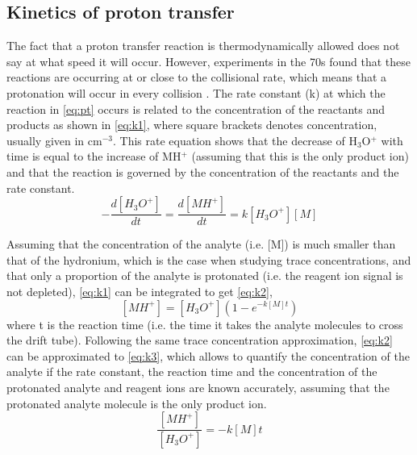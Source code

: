 \subsection{Kinetics of proton transfer}
The fact that a proton transfer reaction is thermodynamically allowed  does not say at what speed it will occur. %
%
However, \citeauthor{schiff1975flowing} experiments in the 70s found that these reactions are occurring at or close to the collisional rate, which means that a protonation will occur  in every collision \cite{schiff1975flowing}.
%
The rate constant (\acrshort{k}) at which  the reaction in \autoref{eq:pt} occurs is
related to the concentration of the reactants and products as %
shown in \autoref{eq:k1},
where square brackets denotes concentration, usually given in cm$^{-3}$.
%
This rate equation shows that the decrease of H$_3$O$^+$ with time is equal to the increase of MH$^+$ (assuming that this is the only product ion) and that the reaction is governed by the concentration  of the reactants and the rate constant.
\begin{equation}
\label{eq:k1}
-\frac{d[H_3 O^+ ]}{dt} = \frac{d[MH^+]}{dt} = k[H_3 O^+ ][M]
\end{equation}

Assuming that the concentration of the analyte (i.e. [M]) is much smaller than that of the hydronium, which is the case when studying trace concentrations, and that only a  proportion of the analyte is protonated (i.e. the reagent ion signal is not depleted), \autoref{eq:k1} can be integrated to get \autoref{eq:k2},
\begin{equation}
\label{eq:k2}
[MH^+] = [H_3O^+]\left(1-e^{-k[M]t}\right)
\end{equation}
where t is the reaction time (i.e. the time it takes the analyte molecules to cross the drift tube).
%
Following the same trace concentration approximation, \autoref{eq:k2} can be approximated to \autoref{eq:k3}, which allows to quantify the concentration of the analyte if the rate constant, the reaction time and the concentration of the protonated analyte and reagent ions are known accurately, assuming that the protonated analyte molecule is the only product ion.
\begin{equation}
\label{eq:k3}
\frac{[MH^+]}{[H_3O^+]} = -k[M]t
\end{equation}





